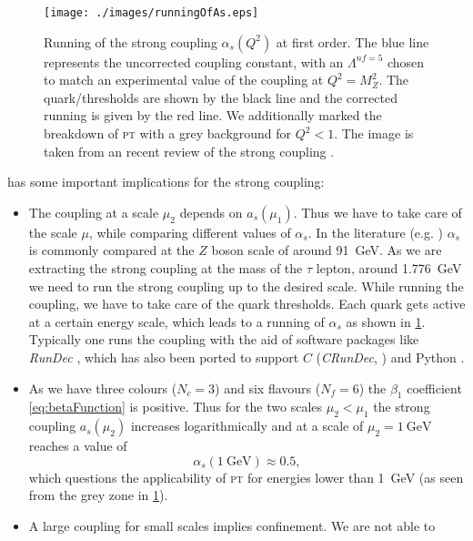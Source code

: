 \documentclass[../../index.tex]{subfiles}
\begin{document}
\begin{figure}
  \centering \texttt{[image: ./images/runningOfAs.eps]}
  \caption{Running of the strong coupling \(\alpha_s(Q^2)\) at first order. The
    blue line represents the uncorrected coupling constant, with an
    \(\Lambda^{nf=5}\) chosen to match an experimental value of the coupling at
    \(Q^2=M_Z^2\). The quark\-/thresholds are shown by the black line and the
    corrected running is given by the red line. We additionally marked the
    breakdown of \textsc{pt} with a grey background for \(Q^2<1\). The image is
    taken from an recent review of the strong coupling \cite{Deur2016}.}
  \label{fig:runningOfAs}
\end{figure}

 has some important implications for the
strong coupling:
\begin{itemize}
\item The coupling at a scale \(\mu_2\) depends on \(a_s(\mu_1)\). Thus we have
  to take care of the scale \(\mu\), while comparing different values of
  \(\alpha_s\). In the literature (e.g. \cite{PDG2018}) \(\alpha_s\) is commonly
  compared at the \(Z\) boson scale of around \SI{91}{\giga\eV}. As we are
  extracting the strong coupling at the mass of the \(\tau\) lepton, around
  \SI{1.776}{\giga\eV} we need to run the strong coupling up to the desired
  scale. While running the coupling, we have to take care of the quark
  thresholds. Each quark gets active at a certain energy scale, which leads to a
  running of \(\alpha_s\) as shown in \cref{fig:runningOfAs}. Typically one runs
  the coupling with the aid of software packages like \textit{RunDec}
  \cite{Chetyrkin2000,Herren2017}, which has also been ported to support \(C\)
  (\textit{CRunDec}, \cite{Schmidt2012}) and Python \cite{Straub2016}.
\item As we have three colours (\(N_c=3\)) and six flavours (\(N_f=6\)) the
  \(\beta_1\) coefficient \ref{eq:betaFunction} is positive. Thus for the two
  scales \(\mu_2<\mu_1\) the strong coupling \(a_s(\mu_2)\) increases
  logarithmically and at a scale of \(\mu_2=\SI{1}{\giga\eV}\) reaches a value
  of
  \begin{equation}
    \alpha_s(\SI{1}{\giga\eV}) \approx 0.5,
  \end{equation}
  which questions the applicability of \textsc{pt} for energies lower than
  \SI{1}{\giga\eV} (as seen from the grey zone in \cref{fig:runningOfAs}).
\item A large coupling for small scales implies confinement. We are not able to

\end{itemize}
\end{document}
